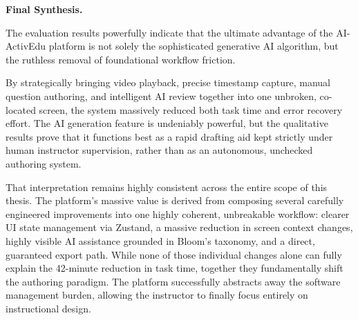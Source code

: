 \textbf{Final Synthesis.}

The evaluation results powerfully indicate that the ultimate advantage of the AI-ActivEdu platform is not solely the sophisticated generative AI algorithm, but the ruthless removal of foundational workflow friction. 

By strategically bringing video playback, precise timestamp capture, manual question authoring, and intelligent AI review together into one unbroken, co-located screen, the system massively reduced both task time and error recovery effort. The AI generation feature is undeniably powerful, but the qualitative results prove that it functions best as a rapid drafting aid kept strictly under human instructor supervision, rather than as an autonomous, unchecked authoring system.

That interpretation remains highly consistent across the entire scope of this thesis. The platform's massive value is derived from composing several carefully engineered improvements into one highly coherent, unbreakable workflow: clearer UI state management via Zustand, a massive reduction in screen context changes, highly visible AI assistance grounded in Bloom's taxonomy, and a direct, guaranteed export path. While none of those individual changes alone can fully explain the 42-minute reduction in task time, together they fundamentally shift the authoring paradigm. The platform successfully abstracts away the software management burden, allowing the instructor to finally focus entirely on instructional design.

